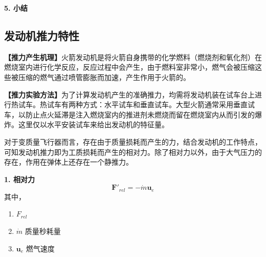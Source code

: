 \vspace*{0.5em}

\noindent \textbf{5. 小结}
\summary[
\quad \vspace*{-1em}
\begin{equation}
	\begin{cases}
		\, \bm{F}'_{rel} = - \dot{m} \bm{\mu}_e & \mbox{附加相对力}\\ 
		\, \bm{F}'_k = -2 \dot{m}\bm{\omega}_T \times\bm{\rho}_e & \mbox{附加哥氏力}\\
		\, \bm{M}'_{rel} = - \dot{m}\bm{\rho}_e \times \bm{\mu}_e & \mbox{附加相对力矩}\\ 
		\, \bm{M}'_k = - \dfrac{\delta I}{\delta t}\cdot \bm{\omega}_T - \dot{m}\bm{\rho}_e \times (\bm{\omega}_T \times \bm{\rho}_e) & \mbox{附加哥氏力矩}
	\end{cases}  
\quad \longrightarrow \quad  
	\begin{cases}
		\, \bm{\mu}_e , \dot{m} & \mbox{发动机设计确定参数} \\
		\, \bm{I}, \bm{\rho}_e & \mbox{总体设计确定参数} \\
		\, \bm{\omega}_T & \mbox{飞行状态参数}
	\end{cases}
\end{equation}
]


\subsection{发动机推力特性}
\textbf{【推力产生机理】}\quad 火箭发动机是将火箭自身携带的化学燃料（燃烧剂和氧化剂）在燃烧室内进行化学反应，反应过程中会产生\red[高温高压燃气]，由于燃料室非常小，燃气会被压缩这些被压缩的燃气通过喷管膨胀而加速，产生作用于火箭的\red[反作用力]。

\textbf{【推力实验方法】}\quad 为了计算发动机产生的准确推力，均需将发动机装在试车台上进行热试车。热试车有两种方式：水平试车和垂直试车。大型火箭通常采用垂直试车，以防止点火延滞是注入燃烧室内的推进剂未燃烧而留在燃烧室内从而引发的爆炸。这里仅以水平安装试车来给出发动机的特征量。

对于变质量飞行器而言，存在由于质量损耗而产生的力，结合发动机的工作特点，可知发动机推力即为工质损耗而产生的相对力。除了相对力以外，由于大气压力的存在，作用在弹体上还存在一个静推力。
\vspace*{0.5em}

\noindent \textbf{1. 相对力}
\begin{equation}
	\bm{F}'_{rel} = -\dot{m}\bm{u}_e
\end{equation}
其中，\vspace*{-0.5em}
\begin{enumerate}[\hspace*{2em}]
	\item $F_{rel}$ \quad {}\vspace*{-0.5em}
	\item $\dot{m}$ \quad 质量秒耗量\vspace*{-0.5em}
	\item $\bm{u}_e$ \quad 燃气速度
\end{enumerate}
\vspace*{0.5em}

